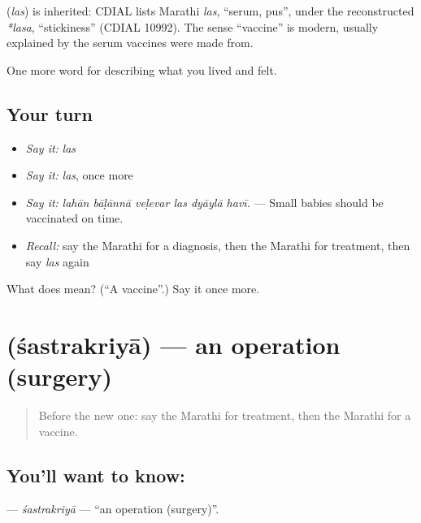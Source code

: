 \begin{cousinweb}
\textbf{} (\emph{las}) is inherited: CDIAL lists Marathi \emph{las}, \textquotedblleft{}serum, pus\textquotedblright{}, under the reconstructed \emph{*lasa}, \textquotedblleft{}stickiness\textquotedblright{} (CDIAL 10992). The sense \textquotedblleft{}vaccine\textquotedblright{} is modern, usually explained by the serum vaccines were made from.
\end{cousinweb}

\begin{grammarlens}[title={What you've built}]
One more word for describing what you lived and felt.
\end{grammarlens}

\subsection*{Your turn}
\begin{itemize}
\raggedright
  \item \emph{Say it:} \emph{las}
  \item \emph{Say it:} \emph{las}, once more
  \item \emph{Say it:} \emph{lahān bāḷānnā veḷevar las dyāylā havī.} — Small babies should be vaccinated on time.
  \item \emph{Recall:} say the Marathi for a diagnosis, then the Marathi for treatment, then say \emph{las} again
\end{itemize}

\begin{tcolorbox}[breakable,colback=teal!4,colframe=teal!35!black,title={Before you move on}]
What does  mean? (\textquotedblleft{}A vaccine\textquotedblright{}.) Say it once more.
\end{tcolorbox}
\section[\texorpdfstring{\mr{शस्त्रक्रिया} (śastrakriyā)}{शस्त्रक्रिया (śastrakriyā)}]{ (śastrakriyā) — an operation (surgery)}

\label{lesson:MR-C489-sastrakriya}



\begin{quote}
Before the new one: say the Marathi for treatment, then the Marathi for a vaccine.
\end{quote}

\subsection*{You'll want to know: }
\textbf{} — \emph{śastrakriyā} — \textquotedblleft{}an operation (surgery)\textquotedblright{}.

